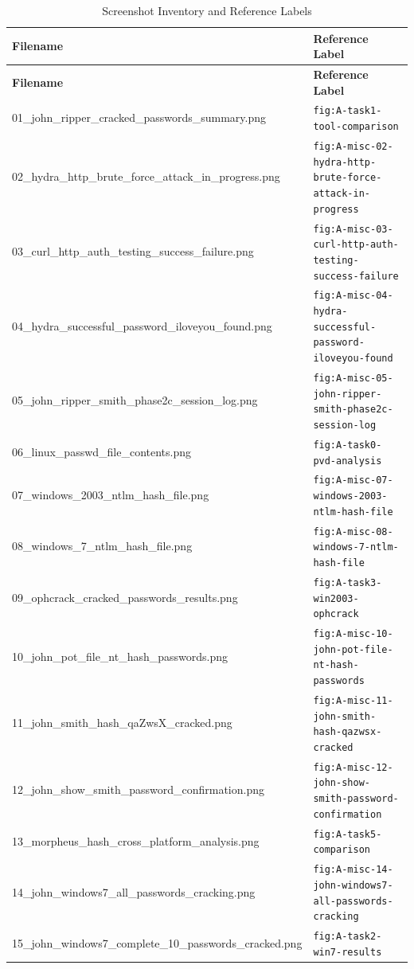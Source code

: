 \begin{longtable}{@{}p{6cm}p{8cm}@{}}
\caption{Screenshot Inventory and Reference Labels}\label{tab:screenshot-inventory}\\
\toprule
\textbf{Filename} & \textbf{Reference Label} \\
\midrule
\endfirsthead
\toprule
\textbf{Filename} & \textbf{Reference Label} \\
\midrule
\endhead
01\_john\_ripper\_cracked\_passwords\_summary.png & \texttt{fig:A-task1-tool-comparison} \\
02\_hydra\_http\_brute\_force\_attack\_in\_progress.png & \texttt{fig:A-misc-02-hydra-http-brute-force-attack-in-progress} \\
03\_curl\_http\_auth\_testing\_success\_failure.png & \texttt{fig:A-misc-03-curl-http-auth-testing-success-failure} \\
04\_hydra\_successful\_password\_iloveyou\_found.png & \texttt{fig:A-misc-04-hydra-successful-password-iloveyou-found} \\
05\_john\_ripper\_smith\_phase2c\_session\_log.png & \texttt{fig:A-misc-05-john-ripper-smith-phase2c-session-log} \\
06\_linux\_passwd\_file\_contents.png & \texttt{fig:A-task0-pvd-analysis} \\
07\_windows\_2003\_ntlm\_hash\_file.png & \texttt{fig:A-misc-07-windows-2003-ntlm-hash-file} \\
08\_windows\_7\_ntlm\_hash\_file.png & \texttt{fig:A-misc-08-windows-7-ntlm-hash-file} \\
09\_ophcrack\_cracked\_passwords\_results.png & \texttt{fig:A-task3-win2003-ophcrack} \\
10\_john\_pot\_file\_nt\_hash\_passwords.png & \texttt{fig:A-misc-10-john-pot-file-nt-hash-passwords} \\
11\_john\_smith\_hash\_qaZwsX\_cracked.png & \texttt{fig:A-misc-11-john-smith-hash-qazwsx-cracked} \\
12\_john\_show\_smith\_password\_confirmation.png & \texttt{fig:A-misc-12-john-show-smith-password-confirmation} \\
13\_morpheus\_hash\_cross\_platform\_analysis.png & \texttt{fig:A-task5-comparison} \\
14\_john\_windows7\_all\_passwords\_cracking.png & \texttt{fig:A-misc-14-john-windows7-all-passwords-cracking} \\
15\_john\_windows7\_complete\_10\_passwords\_cracked.png & \texttt{fig:A-task2-win7-results} \\

\end{longtable}
